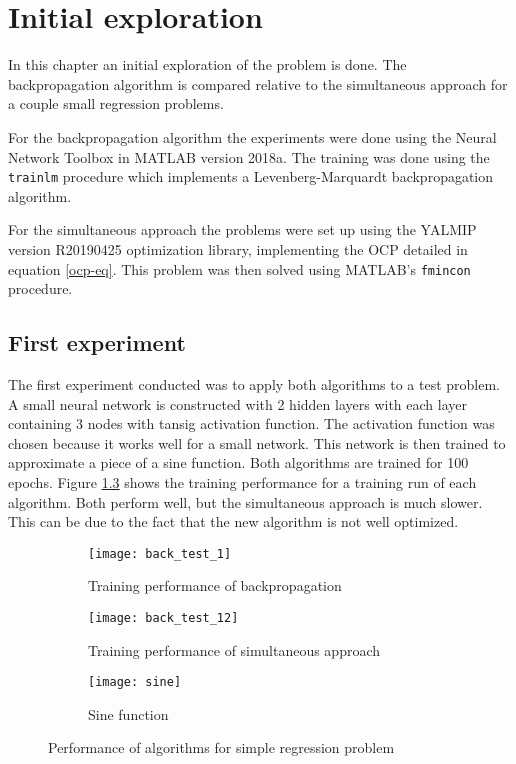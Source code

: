 
\chapter{Initial exploration}
\label{cha:1}
In this chapter an initial exploration of the problem is done. The backpropagation algorithm is compared relative to the simultaneous approach for a couple small regression problems.

For the backpropagation algorithm the experiments were done using the Neural Network Toolbox in MATLAB version 2018a. The training was done using the \texttt{trainlm} procedure which implements a Levenberg-Marquardt backpropagation algorithm.

For the simultaneous approach the problems were set up using the YALMIP version R20190425 optimization library, implementing the OCP detailed in equation \ref{ocp-eq}. This problem was then solved using MATLAB's \texttt{fmincon} procedure.

\section{First experiment}
The first experiment conducted was to apply both algorithms to a test problem. A small neural network is constructed with 2 hidden layers with each layer containing 3 nodes with tansig activation function. The activation function was chosen because it works well for a small network. This network is then trained to approximate a piece of a sine function. Both algorithms are trained for 100 epochs. Figure \ref{} shows the training performance for a training run of each algorithm. Both perform well, but the simultaneous approach is much slower. This can be due to the fact that the new algorithm is not well optimized.

\begin{figure}
     \centering
     \begin{subfigure}[b]{0.8\textwidth}
         \centering
         \texttt{[image: back\_test\_1]}
         \caption{Training performance of backpropagation}
         \label{fig:y equals x}
     \end{subfigure}
     \begin{subfigure}[b]{0.8\textwidth}
         \centering
         \texttt{[image: back\_test\_12]}
         \caption{Training performance of simultaneous approach}
         \label{}
     \end{subfigure}
     \begin{subfigure}[b]{0.8\textwidth}
         \centering
         \texttt{[image: sine]}
         \caption{Sine function}
         \label{}
     \end{subfigure}
        \caption{Performance of algorithms for simple regression problem}
        \label{fig:three graphs}
\end{figure}




